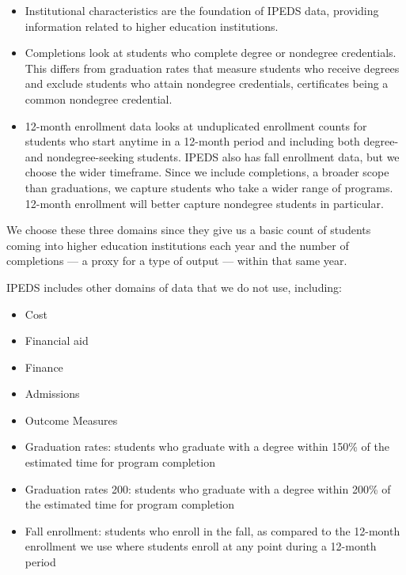 \documentclass[sigconf, authorversion, nonacm]{acmart}
\begin{document}
        \begin{itemize}
            \item Institutional characteristics are the foundation of IPEDS data, providing information related to higher education institutions.
            \item Completions look at students who complete degree or nondegree credentials. This differs from graduation rates that measure students who receive degrees and exclude students who attain nondegree credentials, certificates being a common nondegree credential.
            \item 12-month enrollment data looks at unduplicated enrollment counts for students who start anytime in a 12-month period and including both degree- and nondegree-seeking students. IPEDS also has fall enrollment data, but we choose the wider timeframe. Since we include completions, a broader scope than graduations, we capture students who take a wider range of programs. 12-month enrollment will better capture nondegree students in particular.
        \end{itemize}

        We choose these three domains since they give us a basic count of students coming into higher education institutions each year and the number of completions --- a proxy for a type of output --- within that same year.

        IPEDS includes other domains of data that we do not use, including:

        \begin{itemize}
            \item Cost
            \item Financial aid
            \item Finance
            \item Admissions
            \item Outcome Measures
            \item Graduation rates: students who graduate with a degree within 150\% of the estimated time for program completion
            \item Graduation rates 200: students who graduate with a degree within 200\% of the estimated time for program completion
            \item Fall enrollment: students who enroll in the fall, as compared to the 12-month enrollment we use where students enroll at any point during a 12-month period
        \end{itemize}
\end{document}
